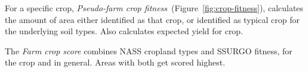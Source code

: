 \documentclass{elsart}
\begin{document}
For a specific crop, \emph{Pseudo-farm crop
  fitness}~(Figure~\ref{fig:crop-fitness}), calculates the amount of
area either identified as that crop, or identified as typical crop for
the underlying soil types.  Also calculates expected yield for crop.
  
%


The \emph{Farm crop score} combines NASS cropland types and SSURGO
fitness, for the crop and in general.  Areas with both get scored
highest.
\end{document}
